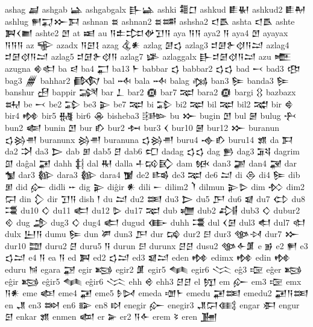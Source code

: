  ashag  𒃷   
 ashgab  𒀿   
 ashgabgalx  𒃲𒀿    
 ashki  𒍤𒆸    
 ashkud  𒀾𒈽    
 ashkud2  𒀾𒈹    
 ashlug  𒂍𒍑𒁍𒁕    
 ashnan  𒊺   
 ashnan2  𒊺𒌁    
 ashsha2  𒃰𒋺    
 ashta  𒃰𒋺    
 ashte  𒀉𒌋𒆤    
 ashte2  𒆹   
 at  𒀜   
 au  𒀀𒉺𒄐𒉻𒋛𒀀    
 aya  𒀀𒀀    
 aya2  𒀀   
 aya4  𒆹   
 ayayax  𒀀𒀀𒀀    
 az  𒊍   
 azadx  𒀀𒇉𒋙    
 azag  𒆬𒀭    
 azlag  𒌆𒌓    
 azlag3  𒄑𒌆𒉿𒋼𒀀𒁺    
 azlag4  𒄑𒌆𒋼𒀀𒁺    
 azlag5  𒄑𒌆𒉿𒋼𒀀    
 azlag7  𒈐   
 azlaggalx  𒃲𒄑𒌆𒋼𒀀𒁺    
 azu  𒍬   
 azugna  𒄯𒊕    
 ba  𒁀   
 ba4  𒂷   
 ba13  𒈨   
 babbar  𒌓   
 babbar2  𒌓𒌓    
 bad  𒁁   
 bad3  𒂦   
 bag3  𒁂   
 bahhar2  𒁃   
 bal  𒁄   
 bala  𒁄   
 balag  𒁆   
 ban3  𒌉   
 banda3  𒌉   
 banshur  𒍎   
 bappir  𒋋   
 bar  𒁇   
 bar2  𒁈   
 bar7  𒉈   
 bara2  𒁈   
 bargi  𒌐   
 bazbazx  𒊻   
 be  𒁁   
 be2  𒁉   
 be3  𒉌   
 be7  𒉈   
 bi  𒁉   
 bi2  𒉈   
 bil  𒉈   
 bil2  𒉋   
 bir  𒄵   
 bir4  𒂔   
 bir5  𒉆   
 bir6  𒊶   
 bisheba3  𒄡   
 bu  𒁍   
 bugin  𒆹   
 bul  𒇧   
 bulug  𒁑   
 bun2  𒅮   
 bunin  𒆹   
 bur  𒁓   
 bur2  𒁔   
 bur3  𒌋   
 bur10  𒇧   
 bur12  𒁍   
 buranun  𒌓𒄒𒉣    
 buranunx  𒄒𒉣    
 buranuna  𒌓𒄒𒉣    
 buru4  𒉢𒁓    
 buru14  𒂙   
 da  𒁕   
 da2  𒋫   
 da3  𒆕   
 dab  𒁳   
 dab5  𒆪   
 dab6  𒍏   
 dadag  𒌓𒌓    
 dag  𒁖   
 dag3  𒍴
 dagrim  𒇑
 daĝal 𒂼 
 dahh  𒈭   
 dal  𒊑   
 dalla  𒈦𒄘𒃼    
 dam  𒁮   
 dan3  𒃩   
 dan4  𒃋   
 dar  𒁯   
 dar3  𒁰   
 dara3  𒁰   
 dara4  𒁱   
 de2  𒌤   
 de3  𒉈   
 de6  𒁺   
 di  𒁲   
 di4  𒌉   
 dib  𒁳   
 did  𒅎   
 didli  𒐀   
 dig  𒉌   
 diĝir  𒀭   
 dili  𒀸   
 dilim2  𒇺   
 dilmun  𒉌𒌇    
 dim  𒁴   
 dim2  𒁶   
 din  𒁷   
 dir  𒋛𒀀    
 dish  𒁹   
 du  𒁺   
 du2  𒌅   
 du3  𒆕   
 du5  𒂅   
 du6  𒇯   
 du7  𒌌   
 du8  𒂃
 du10 𒄭
 du11  𒅗   
 du12  𒌇   
 du17  𒉈   
 dub  𒁾   
 dub2  𒂀   
 dub3  𒄭   
 dubur2  𒄶   
 dug  𒂁   
 dug3  𒄭   
 dug4  𒅗   
 dugud  𒂂   
 duhh  𒂃   
 dul  𒌋𒌆    
 dul3  𒊨   
 dul7  𒊕   
 dulx  𒌨𒀀       
 dumu  𒌉   
 dun  𒂄   
 dun3  𒂅   
 dur  𒄙   
 dur2  𒂉   
 dur3  𒀲𒀴    
 dur7  𒁍   
 dur10  𒊿   
 duru2  𒆪   
 duru5  𒀀   
 durun  𒂉   
 durunx  𒆪𒆪    
 dusu2  𒀲𒅆𒂠    
 e  𒂊   
 e2  𒂍   
 e3  𒌓𒁺    
 e4  𒀀   
 ea  𒀀   
 ed  𒀉   
 ed2  𒌓𒁺    
 ed3  𒇯𒁺    
 eden  𒂔   
 edimx  𒂔   
 edin  𒂔   
 eduru  𒀁   
 egara  𒃌   
 egir  𒂕   
 egir2  𒂠   
 egir5  𒈝   
 egir6  𒈱   
 eĝ3  𒉘   
 eĝer  𒂕   
 eĝir  𒂕   
 eĝir5  𒈝   
 eĝir6  𒈱   
 ehh  𒄴   
 ehh3  𒆪𒆪    
 el  𒂖   
 em  𒅎   
 em3  𒉘   
 emx  𒀀𒀭    
 eme  𒅴   
 eme4  𒂼   
 eme5  𒊩𒄸    
 emeda  𒌝𒈨    
 emedu  𒂼𒌅    
 emedu2  𒂼𒀀𒌅    
 en  𒂗   
 en3  𒇷   
 en6  𒅔   
 en8  𒊭   
 enegir  𒅎   
 enegir3  𒂗𒁶𒍼    
 engar  𒀳   
 engur  𒇉   
 enkar  𒂙   
 enmen  𒆉   
 er  𒅕   
 er2  𒀀𒅆    
 erem  𒂟   
 eren  𒂞   
